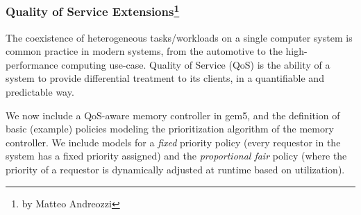 \subsubsection[Quality of Service Extensions]{Quality of Service Extensions\footnote{by Matteo Andreozzi}}

The coexistence of heterogeneous tasks/workloads on a single computer system is common practice in modern systems, from the automotive to the high-performance computing use-case.
Quality of Service (QoS) is the ability of a system to provide differential treatment to its clients, in a quantifiable and predictable way.



We now include a QoS-aware memory controller in gem5, and the definition of basic (example) policies modeling the prioritization algorithm of the memory controller.
We include models for a \emph{fixed} priority policy (every requestor in the system has a fixed priority assigned) and the \emph{proportional fair} policy (where the priority of a requestor is dynamically adjusted at runtime based on utilization).

